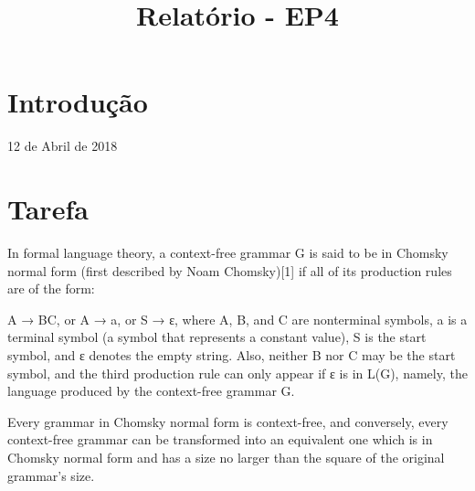 \documentclass[conference]{IEEEtran}
\begin{document}
\title{Relatório - EP4}

\author{
}

\maketitle

\section{Introdução}

\hfill 12 de Abril de 2018

\section{Tarefa}

In formal language theory, a context-free grammar G is said to be in Chomsky normal form (first described by Noam Chomsky)[1] if all of its production rules are of the form:

A → BC,   or
A → a,   or
S → ε,
where A, B, and C are nonterminal symbols, a is a terminal symbol (a symbol that represents a constant value), S is the start symbol, and ε denotes the empty string. Also, neither B nor C may be the start symbol, and the third production rule can only appear if ε is in L(G), namely, the language produced by the context-free grammar G.

Every grammar in Chomsky normal form is context-free, and conversely, every context-free grammar can be transformed into an equivalent one which is in Chomsky normal form and has a size no larger than the square of the original grammar's size.



\end{document}
